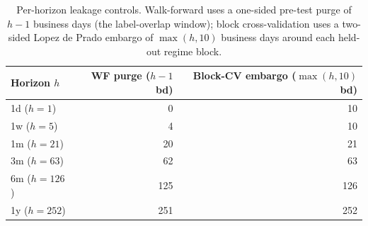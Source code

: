\begin{table}[htbp]
\centering
\caption{Per-horizon leakage controls. Walk-forward uses a one-sided pre-test purge of $h-1$ business days (the label-overlap window); block cross-validation uses a two-sided Lopez de Prado embargo of $\max(h,10)$ business days around each held-out regime block.}
\label{tab:app_purge}
\begin{tabular}{lrr}
\toprule
Horizon $h$ & WF purge ($h-1$ bd) & Block-CV embargo ($\max(h,10)$ bd) \\
\midrule
1d ($h=1$) & 0 & 10 \\
1w ($h=5$) & 4 & 10 \\
1m ($h=21$) & 20 & 21 \\
3m ($h=63$) & 62 & 63 \\
6m ($h=126$) & 125 & 126 \\
1y ($h=252$) & 251 & 252 \\
\bottomrule
\end{tabular}
\end{table}
